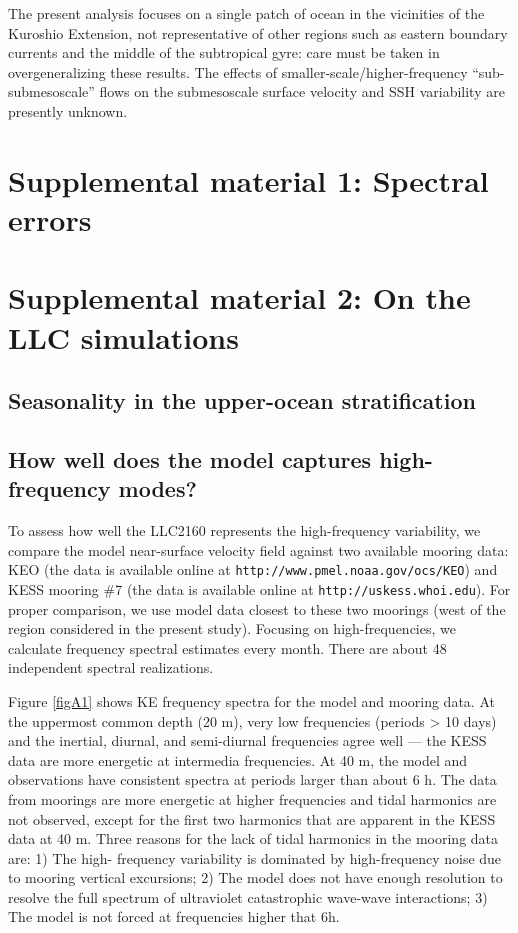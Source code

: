 \documentclass[grl]{agutex2015}
\begin{document}
\begin{article}
The present analysis focuses on a single patch of ocean in the
vicinities of the Kuroshio Extension, not
representative of other regions such as eastern boundary currents
and the middle of the subtropical gyre: care must be taken in overgeneralizing
these results.  The effects of smaller-scale/higher-frequency
``sub-submesoscale'' flows on the submesoscale surface velocity and SSH variability
are presently unknown.

\clearpage

\section{Supplemental material 1: Spectral errors}

\section{Supplemental material 2: On the LLC simulations}

\subsection{Seasonality in the upper-ocean stratification}

\subsection{How well does the model captures high-frequency modes?}
To assess how well the LLC2160 represents the high-frequency variability,
we compare the model near-surface velocity field against two available
mooring data: KEO (the data is available online at \texttt{http://www.pmel.noaa.gov/ocs/KEO})
and KESS mooring $\#$7 (the data is available online at \texttt{http://uskess.whoi.edu}).
For proper comparison, we use model data closest to these two moorings (west of
the region considered in the present study). Focusing on high-frequencies, we
calculate frequency spectral estimates every month. There are about 48 independent
spectral realizations.

Figure \ref{figA1} shows KE frequency spectra for the model and mooring data.
At the uppermost common depth (20 m), very low frequencies (periods > 10 days)
and the inertial, diurnal, and semi-diurnal frequencies agree well --- the KESS
data are more energetic at intermedia frequencies. At 40 m, the model and observations
have consistent spectra at periods larger than about 6 h. The data from moorings
are more energetic at higher frequencies and tidal harmonics are not observed,
except for the first two harmonics that are apparent in the KESS data at 40 m.
Three reasons for the lack of tidal harmonics in the mooring data are: 1) The high-
frequency variability is dominated by high-frequency noise due to mooring vertical
excursions; 2) The model does not have enough resolution to resolve the full spectrum
of ultraviolet catastrophic wave-wave interactions; 3) The model is not forced at
frequencies higher that 6h.


\end{article}
\end{document}
